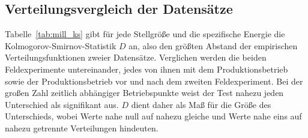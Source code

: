 \subsection{Verteilungsvergleich der Datensätze}\label{app:mill_ks}
%
Tabelle~\ref{tab:mill_ks} gibt für jede Stellgröße und die spezifische Energie die Kolmogorov-Smirnov-Statistik $D$ an, also den größten Abstand der empirischen Verteilungsfunktionen zweier Datensätze. Verglichen werden die beiden Feldexperimente untereinander, jedes von ihnen mit dem Produktionsbetrieb sowie der Produktionsbetrieb vor und nach dem zweiten Feldexperiment. Bei der großen Zahl zeitlich abhängiger Betriebspunkte weist der Test nahezu jeden Unterschied als signifikant aus. $D$ dient daher als Maß für die Größe des Unterschieds, wobei Werte nahe null auf nahezu gleiche und Werte nahe eins auf nahezu getrennte Verteilungen hindeuten.
%
%
